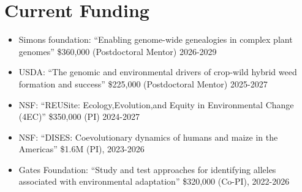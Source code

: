 \documentclass[letterpaper,10pt]{article}
\begin{document}
\section*{Current Funding}
\begin{itemize}
\item Simons foundation: ``Enabling genome-wide genealogies in complex plant genomes'' \$360,000 (Postdoctoral Mentor) 2026-2029
\item USDA: ``The genomic and environmental drivers of crop-wild hybrid weed formation and success'' \$225,000 (Postdoctoral Mentor) 2025-2027 
\item NSF: ``REUSite: Ecology,Evolution,and Equity in Environmental Change (4EC)'' \$350,000 (PI) 2024-2027
\item NSF: ``DISES: Coevolutionary dynamics of humans and maize in the Americas'' \$1.6M (PI), 2023-2026
\item Gates Foundation: ``Study and test approaches for identifying alleles associated with environmental adaptation'' \$320,000 (Co-PI), 2022-2026

\end{itemize}
\end{document}
